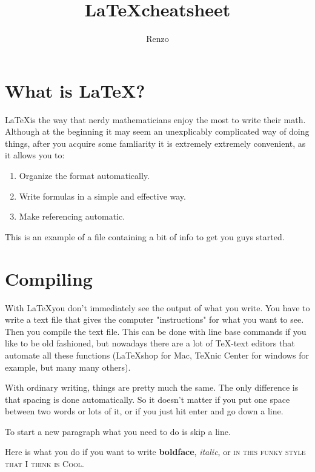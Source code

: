 \documentclass[12pts]{article}
\newcommand{\La}{\LaTeX}
\begin{document}
\title{\LaTeX cheatsheet}
\author{Renzo}

\maketitle

\section{What is \LaTeX ?}
\label{intro}

\LaTeX is the way that nerdy mathematicians enjoy the most to write their math. Although at the beginning it may seem an unexplicably complicated way of doing things, after you acquire some famliarity it is extremely extremely convenient, as it allows you to:

\begin{enumerate}
	\item Organize the format automatically.
	\item Write formulas in a simple and effective way.
	\item Make referencing automatic.
\end{enumerate}

This is an example of a file containing a bit of info to get you guys started.

\section{Compiling}

With \La you don't immediately see the output of what you write. You have to write a text file that gives the computer "instructions" for what you want to see.  Then you compile the text file. This can be done with line base commands if you like to be old fashioned, but nowadays there are a lot of  \TeX-text editors that automate all these functions (\La shop for Mac, TeXnic Center for windows for example, but many many others). 

With ordinary writing, things are pretty much the same. The only difference is that
spacing is done automatically. So it doesn't matter if you put one space between two 
words                                         or  lots of it, or
if you just hit enter and go down a line.

To start a new paragraph what you need to do is skip a line.

Here is what you do if you want to write \textbf{boldface}, \textit{italic}, or \textsc{in this funky style that I think is Cool}.
\end{document}
